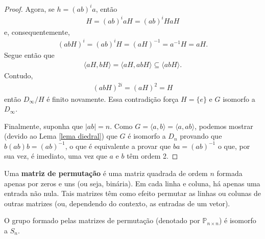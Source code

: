 \begin{proof}
		\par\vspace{0.3cm} Agora, se $h = (ab)^ia$, então
		\begin{align*}
		    H = (ab)^iaH = (ab)^iHaH
		\end{align*}
		e, consequentemente, 
		\begin{align*}
		    (abH)^i = (ab)^iH = (aH)^{-1} = a^{-1}H = aH.
		\end{align*}
		Segue então que
		\begin{align*}
		    \langle aH, bH \rangle = \langle aH, abH \rangle\subseteq \langle abH \rangle.
		\end{align*}
		Contudo, 
		\begin{align*}
		    (abH)^{2i} = (aH)^2 = H
		\end{align*}
		então $D_{\infty}/H$ é finito novamente. Essa contradição força 
		$H = \{e\}$ e $G$ isomorfo a $D_{\infty}$.
		
		\par\vspace{0.3cm} Finalmente, suponha que $|ab| = n$. Como $G = \langle a,b \rangle 
		= \langle a,ab \rangle$, podemos mostrar (devido ao Lema \ref{lema diedral}) que $G$ é isomorfo 
		a $D_n$ provando que $b(ab)b = (ab)^{-1}$, o que é equivalente a provar que $ba = (ab)^{-1}$ o que, 
		por sua vez, é imediato, uma vez que $a$ e $b$ têm ordem 2.
	\end{proof}
	\begin{definition}
	\label{def-matrizes-perm}
		Uma \textbf{matriz de permutação} é uma matriz quadrada de ordem $n$ formada apenas por zeros 
		e uns (ou seja, binária). Em cada linha e coluna, há apenas uma entrada não nula. Tais matrizes 
		têm como efeito permutar as linhas ou colunas de outras matrizes (ou, dependendo do contexto, as 
		entradas de um vetor).
	\end{definition}
	\begin{lemma}
	\label{matrizes de permutacao}
		O grupo formado pelas matrizes de permutação (denotado por $\mathbb{P}_{n\times n}$) é isomorfo a $S_n$.
	\end{lemma}
